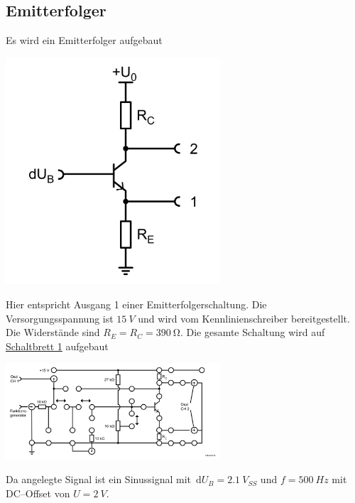 \documentclass[10pt]{article}
\newcommand{\td}{\,\text{d}}
\newenvironment{Figure}
  {\par\medskip\noindent\minipage{\linewidth}}
  {\endminipage\par\medskip}
\begin{document}
\begin{multicols}{2}
        \subsection{Emitterfolger}
        Es wird ein Emitterfolger aufgebaut
        \begin{Figure}
                \centering
                \includegraphics[width=0.6\textwidth]{emitterfolger.png}
        \end{Figure}
        Hier entspricht Ausgang 1 einer Emitterfolgerschaltung.
        Die Versorgungsspannung ist $\SI{15}{V}$ und wird vom Kennlinienschreiber bereitgestellt.
        Die Widerstände sind $R_E=R_C=\SI{390}{\ohm}$.
        Die gesamte Schaltung wird auf \hyperref[fig:schaltbrett_1]{Schaltbrett 1} aufgebaut
        \begin{Figure}
                \centering
                \includegraphics[width=0.6\textwidth]{schaltbrett_1.png}
                 \label{fig:schaltbrett_1}
        \end{Figure}
        Da angelegte Signal ist ein Sinussignal mit $\td U_B=\SI{2.1}{V_{SS}}$ und $f=\SI{500}{Hz}$ mit DC--Offset von $U=\SI{2}{V}$.
        \begin{Figure}

\end{Figure}
\end{multicols}
\end{document}

